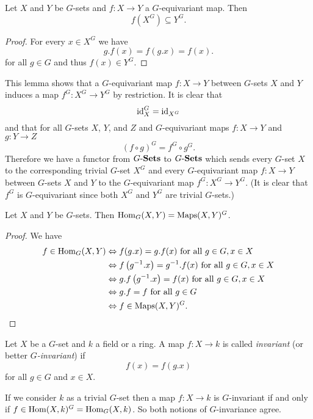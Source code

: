 \begin{lem}
 Let $X$ and $Y$ be $G$-sets and $f \colon X \to Y$ a $G$-equivariant map. Then
 \[
  f\left( X^G \right) \subseteq Y^G.
 \]
\end{lem}
\begin{proof}
 For every $x \in X^G$ we have
 \[
  g.f(x) = f(g.x) = f(x).
 \]
 for all $g \in G$ and thus $f(x) \in Y^G$.
\end{proof}


This lemma shows that a $G$-equivariant map $f \colon X \to Y$ between $G$-sets $X$ and $Y$ induces a map $f^G \colon X^G \to Y^G$ by restriction. It is clear that
\[
 \operatorname{id}_X^G = \operatorname{id}_{X^G}
\]
and that for all $G$-sets $X$, $Y$, and $Z$ and $G$-equivariant maps $f \colon X \to Y$ and $g \colon Y \to Z$
\[
 (f \circ g)^G =  f^G \circ g^G.
\]
Therefore we have a functor from $G\text{-}\mathbf{Sets}$ to $G\text{-}\mathbf{Sets}$ which sends every $G$-set $X$ to the corresponding trivial $G$-set $X^G$ and every $G$-equivariant map $f \colon X \to Y$ between $G$-sets $X$ and $Y$ to the $G$-equivariant map $f^G \colon X^G \to Y^G$. (It is clear that $f^G$ is $G$-equivariant since both $X^G$ and $Y^G$ are trivial $G$-sets.)


\begin{lem}
 Let $X$ and $Y$ be $G$-sets. Then $\operatorname{Hom}_G(X,Y) = \operatorname{Maps}(X,Y)^G$.
\end{lem}
\begin{proof}
 We have
 \begin{align*}
  f \in \operatorname{Hom}_G(X,Y)
  &\Leftrightarrow f(g.x) = g.f(x) \text{ for all } g \in G, x \in X \\
  &\Leftrightarrow f\left(g^{-1}.x\right) = g^{-1}.f(x) \text{ for all } g \in G, x \in X \\
  &\Leftrightarrow g.f\left(g^{-1}.x\right) = f(x) \text{ for all } g \in G, x \in X \\
  &\Leftrightarrow g.f = f \text{ for all } g \in G \\
  &\Leftrightarrow f \in \operatorname{Maps}(X,Y)^G.
  \qedhere
 \end{align*}
\end{proof}


\begin{defi}
 Let $X$ be a $G$-set and $k$ a field or a ring. A map $f \colon X \to k$ is called \emph{invariant} (or better \emph{$G$-invariant}) if
 \[
  f(x) = f\left( g.x \right)
 \]
 for all $g \in G$ and $x \in X$.
\end{defi}


\begin{note}
 If we consider $k$ as a trivial $G$-set then a map $f \colon X \to k$ is $G$-invariant if and only if $f \in \operatorname{Hom}(X,k)^G = \operatorname{Hom}_G(X,k)$. So both notions of $G$-invariance agree.
\end{note}


